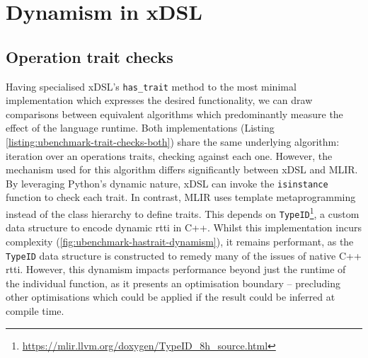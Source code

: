 















\section{Dynamism in xDSL}


\subsection{Operation trait checks}

Having specialised xDSL's \texttt{has_trait} method to the most minimal implementation which expresses the desired functionality, we can draw comparisons between equivalent algorithms which predominantly measure the effect of the language runtime.
Both implementations (Listing \ref{listing:ubenchmark-trait-checks-both}) share the same underlying algorithm: iteration over an operations traits, checking against each one. However, the mechanism used for this algorithm differs significantly between xDSL and MLIR.
By leveraging Python's dynamic nature, xDSL can invoke the \texttt{isinstance} function to check each trait. In contrast, MLIR uses template metaprogramming instead of the class hierarchy to define traits. This depends on \texttt{TypeID}\footnote{\url{https://mlir.llvm.org/doxygen/TypeID_8h_source.html}}, a custom data structure to encode dynamic \ac{rtti} in C++.
Whilst this implementation incurs complexity (\autoref{fig:ubenchmark-hastrait-dynamism}), it remains performant, as the \texttt{TypeID} data structure is constructed to remedy many of the issues of native C++ \ac{rtti}.
However, this dynamism impacts performance beyond just the runtime of the individual function, as it presents an optimisation boundary -- precluding other optimisations which could be applied if the result could be inferred at compile time. %

